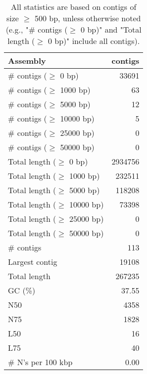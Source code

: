 \documentclass[12pt,a4paper]{article}
\begin{document}
\begin{table}[ht]
\begin{center}
\caption{All statistics are based on contigs of size $\geq$ 500 bp, unless otherwise noted (e.g., "\# contigs ($\geq$ 0 bp)" and "Total length ($\geq$ 0 bp)" include all contigs).}
\begin{tabular}{|l*{1}{|r}|}
\hline
Assembly & contigs \\ \hline
\# contigs ($\geq$ 0 bp) & 33691 \\ \hline
\# contigs ($\geq$ 1000 bp) & 63 \\ \hline
\# contigs ($\geq$ 5000 bp) & 12 \\ \hline
\# contigs ($\geq$ 10000 bp) & 5 \\ \hline
\# contigs ($\geq$ 25000 bp) & 0 \\ \hline
\# contigs ($\geq$ 50000 bp) & 0 \\ \hline
Total length ($\geq$ 0 bp) & 2934756 \\ \hline
Total length ($\geq$ 1000 bp) & 232511 \\ \hline
Total length ($\geq$ 5000 bp) & 118208 \\ \hline
Total length ($\geq$ 10000 bp) & 73398 \\ \hline
Total length ($\geq$ 25000 bp) & 0 \\ \hline
Total length ($\geq$ 50000 bp) & 0 \\ \hline
\# contigs & 113 \\ \hline
Largest contig & 19108 \\ \hline
Total length & 267235 \\ \hline
GC (\%) & 37.55 \\ \hline
N50 & 4358 \\ \hline
N75 & 1828 \\ \hline
L50 & 16 \\ \hline
L75 & 40 \\ \hline
\# N's per 100 kbp & 0.00 \\ \hline
\end{tabular}
\end{center}
\end{table}
\end{document}
